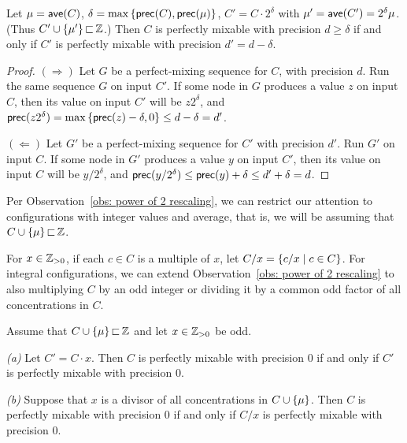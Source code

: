 \begin{observation}%
\label{obs: power of 2 rescaling}
Let $\mu = {\textsf{ave}}(C)$, $\delta = \max{ \left\{ {\textsf{prec}}(C),{\textsf{prec}}(\mu) \right\} }$, 
$C' = C\cdot 2^\delta$ with $\mu'={\textsf{ave}}(C')= 2^\delta\mu$. 
	(Thus $C'\cup{ \left\{ \mu' \right\} }{\,\sqsubset\,}{\mathbb Z}$.)
	Then $C$ is perfectly mixable with precision $d\ge\delta$
	if and only if $C'$ is perfectly mixable with precision $d' = d-\delta$. 
\end{observation}%


\begin{proof}
$(\Rightarrow)$
Let $G$ be a perfect-mixing sequence for $C$, with precision $d$.
Run the same sequence $G$ on input $C'$.
If some node in $G$ produces a value $z$ on input $C$, then its value on input $C'$ will be
$z 2^\delta$, and ${\textsf{prec}}(z 2^\delta) = \max{ \left\{ {\textsf{prec}}(z)-\delta,0 \right\} } \le d-\delta = d'$.

$(\Leftarrow)$
Let $G'$ be a perfect-mixing sequence for $C'$ with precision $d'$.
Run $G'$ on input $C$. If some node in $G'$ produces a value $y$ on input $C'$, then
its value on input $C$ will be $y/2^\delta$, and
${\textsf{prec}}(y/2^\delta) \leq {\textsf{prec}}(y)+\delta \le d'+\delta = d$.
\end{proof}



Per Observation~\ref{obs: power of 2 rescaling}, we can restrict our attention to configurations with integer
values and average, that is, we will be assuming that $C\cup{ \left\{ \mu \right\} }{\,\sqsubset\,} {\mathbb Z}$.

For $x\in{\mathbb{Z}_{> 0}}$, if each $c\in C$ is a multiple of $x$,
let $C/x = { \left\{ c/x \mid c\in C \right\} }$.
For integral configurations, we can extend Observation~\ref{obs: power of 2 rescaling}
to also multiplying $C$ by an odd integer or dividing it by a common odd factor of
all concentrations in $C$. 

\begin{observation}%
\label{obs: odd integer rescaling}
Assume that $C\cup{ \left\{ \mu \right\} }{\,\sqsubset\,} {\mathbb Z}$ and let $x\in{\mathbb{Z}_{> 0}}$ be odd.
%
\begin{description}
%
\item{\emph{(a)}} Let $C' = C\cdot x$. Then
	$C$ is perfectly mixable with precision $0$ if and only if
	$C'$ is perfectly mixable with precision $0$.	
%
\item{\emph{(b)}} Suppose that $x$ 
is a divisor of all concentrations in $C\cup{ \left\{ \mu \right\} }$.
Then $C$ is perfectly mixable with precision $0$ if and only if
$C/x$ is perfectly mixable with precision $0$.
\end{description}	
\end{observation}%

